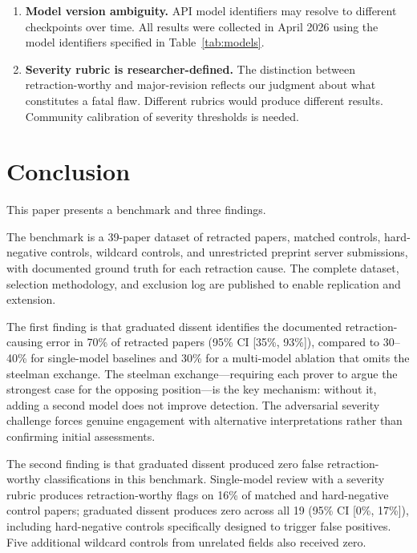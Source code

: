 \documentclass[11pt]{article}
\begin{document}
\begin{enumerate}
\item \textbf{Model version ambiguity.} API model identifiers may resolve to different checkpoints over time. All results were collected in April 2026 using the model identifiers specified in Table~\ref{tab:models}.

\item \textbf{Severity rubric is researcher-defined.} The distinction between retraction-worthy and major-revision reflects our judgment about what constitutes a fatal flaw. Different rubrics would produce different results. Community calibration of severity thresholds is needed.
\end{enumerate}

\section{Conclusion}

This paper presents a benchmark and three findings.

The benchmark is a 39-paper dataset of retracted papers, matched controls, hard-negative controls, wildcard controls, and unrestricted preprint server submissions, with documented ground truth for each retraction cause. The complete dataset, selection methodology, and exclusion log are published to enable replication and extension.

The first finding is that graduated dissent identifies the documented retraction-causing error in 70\% of retracted papers (95\% CI [35\%, 93\%]), compared to 30--40\% for single-model baselines and 30\% for a multi-model ablation that omits the steelman exchange. The steelman exchange---requiring each prover to argue the strongest case for the opposing position---is the key mechanism: without it, adding a second model does not improve detection. The adversarial severity challenge forces genuine engagement with alternative interpretations rather than confirming initial assessments.

The second finding is that graduated dissent produced zero false retraction-worthy classifications in this benchmark. Single-model review with a severity rubric produces retraction-worthy flags on 16\% of matched and hard-negative control papers; graduated dissent produces zero across all 19 (95\% CI [0\%, 17\%]), including hard-negative controls specifically designed to trigger false positives. Five additional wildcard controls from unrelated fields also received zero.
\end{document}
